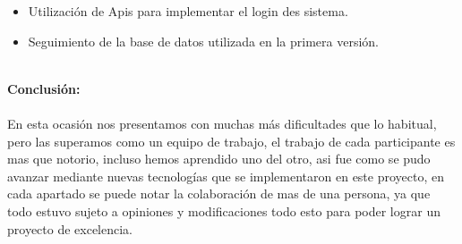 \documentclass[40pt]{article}
\begin{document}
\begin{itemize}
    \item Utilización de Apis para implementar el login des sistema.
    \item Seguimiento de la base de datos utilizada en la primera versión. 
\end{itemize}

\maketitle
\textsf{\ \\
\textbf{Conclusión:}
\\
\\
En esta ocasión nos presentamos con muchas más dificultades que lo habitual, pero las superamos como un equipo de trabajo, el trabajo de cada participante es mas que notorio, incluso hemos aprendido uno del otro, asi fue como se pudo avanzar mediante nuevas tecnologías que se implementaron en este proyecto, en cada apartado se puede notar la colaboración de mas de una persona, ya que todo estuvo sujeto a opiniones y modificaciones todo esto para poder lograr un proyecto de excelencia. \\}
\end{document}
